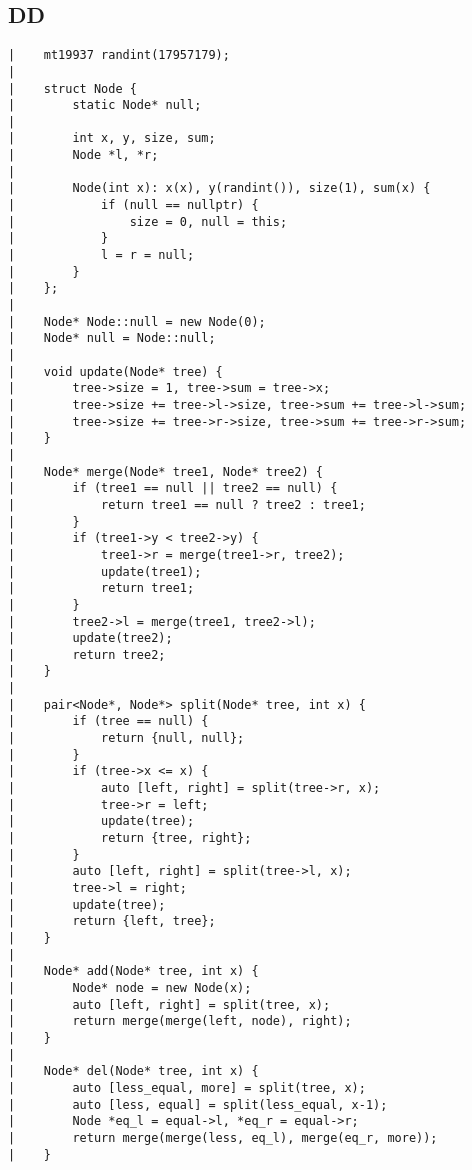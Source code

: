 \documentclass[a4paper, 10pt]{article}
\begin{document}
\begin{center}
\section*{DD}
\begin{verbatim}
|    mt19937 randint(17957179);
|    
|    struct Node {
|        static Node* null;
|    
|        int x, y, size, sum;
|        Node *l, *r;
|    
|        Node(int x): x(x), y(randint()), size(1), sum(x) {
|            if (null == nullptr) {
|                size = 0, null = this;
|            }
|            l = r = null;
|        }
|    };
|    
|    Node* Node::null = new Node(0);
|    Node* null = Node::null;
|    
|    void update(Node* tree) {
|        tree->size = 1, tree->sum = tree->x;
|        tree->size += tree->l->size, tree->sum += tree->l->sum;
|        tree->size += tree->r->size, tree->sum += tree->r->sum;
|    }
|    
|    Node* merge(Node* tree1, Node* tree2) {
|        if (tree1 == null || tree2 == null) {
|            return tree1 == null ? tree2 : tree1;
|        }
|        if (tree1->y < tree2->y) {
|            tree1->r = merge(tree1->r, tree2);
|            update(tree1);
|            return tree1;
|        }
|        tree2->l = merge(tree1, tree2->l);
|        update(tree2);
|        return tree2;
|    }
|    
|    pair<Node*, Node*> split(Node* tree, int x) {
|        if (tree == null) {
|            return {null, null};
|        }
|        if (tree->x <= x) {
|            auto [left, right] = split(tree->r, x);
|            tree->r = left;
|            update(tree);
|            return {tree, right};
|        }
|        auto [left, right] = split(tree->l, x);
|        tree->l = right;
|        update(tree);
|        return {left, tree};
|    }
|    
|    Node* add(Node* tree, int x) {
|        Node* node = new Node(x);
|        auto [left, right] = split(tree, x);
|        return merge(merge(left, node), right);
|    }
|    
|    Node* del(Node* tree, int x) {
|        auto [less_equal, more] = split(tree, x);
|        auto [less, equal] = split(less_equal, x-1);
|        Node *eq_l = equal->l, *eq_r = equal->r;
|        return merge(merge(less, eq_l), merge(eq_r, more));
|    }
\end{verbatim}


\end{center}
\end{document}
